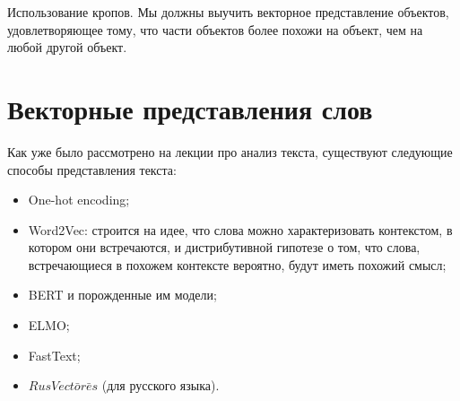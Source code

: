 \begin{example}
    Использование кропов. Мы должны выучить векторное представление объектов, удовлетворяющее тому, что части объектов более похожи на объект, чем на любой другой объект.
\end{example}

\section{Векторные представления слов}

Как уже было рассмотрено на лекции про анализ текста, существуют следующие способы представления текста:
\begin{itemize}
    \item One-hot encoding;
    \item Word2Vec: строится на идее, что слова можно характеризовать контекстом, в котором они встречаются, и дистрибутивной гипотезе о том, что слова, встречающиеся в похожем контексте вероятно, будут иметь похожий смысл;
    \item BERT и порожденные им модели;
    \item ELMO;
    \item FastText;
    \item $RusVect\bar{o}r\bar{e}s$ (для русского языка).
\end{itemize}